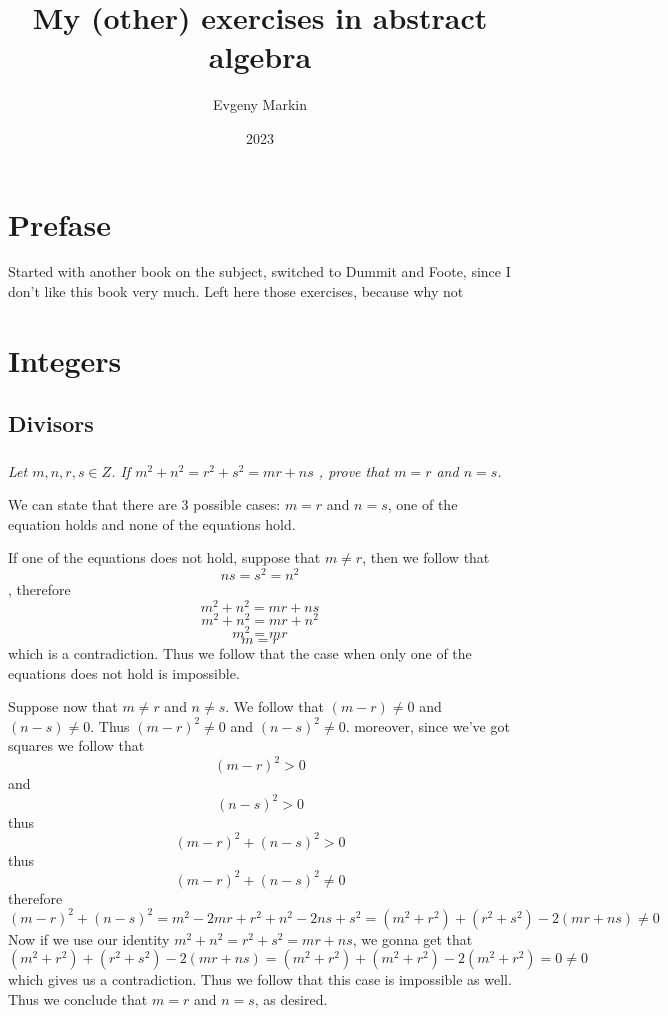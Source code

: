 \documentclass[11pt,oneside,titlepage]{book}
\title{My (other) exercises in abstract algebra}
\author{Evgeny Markin}
\date{2023}
\begin{document}
\maketitle
\tableofcontents


\chapter*{Prefase}

Started with another book on the subject, switched to Dummit and Foote,
since I don't like this book very much. Left here those exercises, because
why not

\chapter{Integers}

\section{Divisors}

\subsection{}

\textit{Let $m, n, r, s \in Z$. If $m^2 + n^2 = r^2 + s^2 = mr + ns$ , prove that $m = r$ and
  $n = s$.}

We can state that there are 3 possible cases: $m = r$ and $n = s$, one of the equation holds and
none of the equations hold. 

If one of the equations does not hold, suppose that $m \neq r$, then we follow that
$$ns = s^2 = n^2$$, therefore
$$m^2 + n^2 = mr + ns$$
$$m^2 + n^2 = mr + n^2$$
$$m^2 = mr$$
$$m = r$$
which is a contradiction. Thus we follow that the case when only one of the equations
does not hold is impossible.

Suppose now that $m \neq r$ and $n \neq s$. We follow that $(m - r) \neq 0$ and
$(n - s) \neq 0$. Thus $(m - r)^2 \neq 0$ and $(n - s)^2 \neq 0$. moreover, since
we've got squares we follow that
$$(m - r)^2 > 0$$
and
$$(n - s)^2 > 0$$
thus
$$(m - r)^2 + (n - s)^2 > 0$$
thus
$$(m - r)^2 + (n - s)^2 \neq 0$$
therefore 
$$(m - r)^2 + (n - s)^2 = m^2 - 2mr + r^2 + n^2 - 2ns + s^2 =
(m^2 + r^2) + (r^2 + s^2) - 2(mr + ns) \neq 0$$
Now if we use our identity  $m^2 + n^2 = r^2 + s^2 = mr + ns$, we gonna get that
$$(m^2 + r^2) + (r^2 + s^2) - 2(mr + ns) = (m^2 + r^2) + (m^2 + r^2) - 2(m^2 + r^2) = 0 \neq 0$$
which gives us a contradiction. Thus we follow that this case is impossible as well.
Thus we conclude that $m = r$ and $n = s$, as desired.
\end{document}
